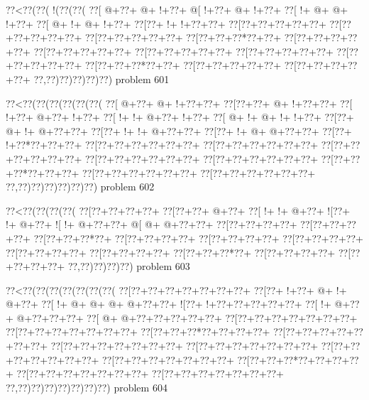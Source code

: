 \vbox{\vbox{\goo
\0??<\0??(\0??(\- !(\0??(\0??(
\0??[\- @+\0??+\- @+\- !+\0??+
\- @[\- !+\0??+\- @+\- !+\0??+
\0??[\- !+\- @+\- @+\- !+\0??+
\0??[\- @+\- !+\- @+\- !+\0??+
\0??[\0??+\- !+\- !+\0??+\0??+
\0??[\0??+\0??+\0??+\0??+\0??+
\0??[\0??+\0??+\0??+\0??+\0??+
\0??[\0??+\0??+\0??+\0??+\0??+
\0??[\0??+\0??+\0??*\0??+\0??+
\0??[\0??+\0??+\0??+\0??+\0??+
\0??[\0??+\0??+\0??+\0??+\0??+
\0??[\0??+\0??+\0??+\0??+\0??+
\0??[\0??+\0??+\0??+\0??+\0??+
\0??[\0??+\0??+\0??+\0??+\0??+
\0??[\0??+\0??+\0??*\0??+\0??+
\0??[\0??+\0??+\0??+\0??+\0??+
\0??[\0??+\0??+\0??+\0??+\0??+
\0??,\0??)\0??)\0??)\0??)\0??)
}
\hfil problem 601\hfil\break
}

\vbox{\vbox{\goo
\0??<\0??(\0??(\0??(\0??(\0??(\0??(
\0??[\- @+\0??+\- @+\- !+\0??+\0??+
\0??[\0??+\0??+\- @+\- !+\0??+\0??+
\0??[\- !+\0??+\- @+\0??+\- !+\0??+
\0??[\- !+\- !+\- @+\0??+\- !+\0??+
\0??[\- @+\- !+\- @+\- !+\- !+\0??+
\0??[\0??+\- @+\- !+\- @+\0??+\0??+
\0??[\0??+\- !+\- !+\- @+\0??+\0??+
\0??[\0??+\- !+\- @+\- @+\0??+\0??+
\0??[\0??+\- !+\0??*\0??+\0??+\0??+
\0??[\0??+\0??+\0??+\0??+\0??+\0??+
\0??[\0??+\0??+\0??+\0??+\0??+\0??+
\0??[\0??+\0??+\0??+\0??+\0??+\0??+
\0??[\0??+\0??+\0??+\0??+\0??+\0??+
\0??[\0??+\0??+\0??+\0??+\0??+\0??+
\0??[\0??+\0??+\0??*\0??+\0??+\0??+
\0??[\0??+\0??+\0??+\0??+\0??+\0??+
\0??[\0??+\0??+\0??+\0??+\0??+\0??+
\0??,\0??)\0??)\0??)\0??)\0??)\0??)
}
\hfil problem 602\hfil\break
}

\vbox{\vbox{\goo
\0??<\0??(\0??(\0??(\0??(
\0??[\0??+\0??+\0??+\0??+
\0??[\0??+\0??+\- @+\0??+
\0??[\- !+\- !+\- @+\0??+
\- ![\0??+\- !+\- @+\0??+
\- ![\- !+\- @+\0??+\0??+
\- @[\- @+\- @+\0??+\0??+
\0??[\0??+\0??+\0??+\0??+
\0??[\0??+\0??+\0??+\0??+
\0??[\0??+\0??+\0??*\0??+
\0??[\0??+\0??+\0??+\0??+
\0??[\0??+\0??+\0??+\0??+
\0??[\0??+\0??+\0??+\0??+
\0??[\0??+\0??+\0??+\0??+
\0??[\0??+\0??+\0??+\0??+
\0??[\0??+\0??+\0??*\0??+
\0??[\0??+\0??+\0??+\0??+
\0??[\0??+\0??+\0??+\0??+
\0??,\0??)\0??)\0??)\0??)
}
\hfil problem 603\hfil\break
}

\vbox{\vbox{\goo
\0??<\0??(\0??(\0??(\0??(\0??(\0??(\0??(
\0??[\0??+\0??+\0??+\0??+\0??+\0??+\0??+
\0??[\0??+\- !+\0??+\- @+\- !+\- @+\0??+
\0??[\- !+\- @+\- @+\- @+\- @+\0??+\0??+
\- ![\0??+\- !+\0??+\0??+\0??+\0??+\0??+
\0??[\- !+\- @+\0??+\- @+\0??+\0??+\0??+
\0??[\- @+\- @+\0??+\0??+\0??+\0??+\0??+
\0??[\0??+\0??+\0??+\0??+\0??+\0??+\0??+
\0??[\0??+\0??+\0??+\0??+\0??+\0??+\0??+
\0??[\0??+\0??+\0??*\0??+\0??+\0??+\0??+
\0??[\0??+\0??+\0??+\0??+\0??+\0??+\0??+
\0??[\0??+\0??+\0??+\0??+\0??+\0??+\0??+
\0??[\0??+\0??+\0??+\0??+\0??+\0??+\0??+
\0??[\0??+\0??+\0??+\0??+\0??+\0??+\0??+
\0??[\0??+\0??+\0??+\0??+\0??+\0??+\0??+
\0??[\0??+\0??+\0??*\0??+\0??+\0??+\0??+
\0??[\0??+\0??+\0??+\0??+\0??+\0??+\0??+
\0??[\0??+\0??+\0??+\0??+\0??+\0??+\0??+
\0??,\0??)\0??)\0??)\0??)\0??)\0??)\0??)
}
\hfil problem 604\hfil\break
}

